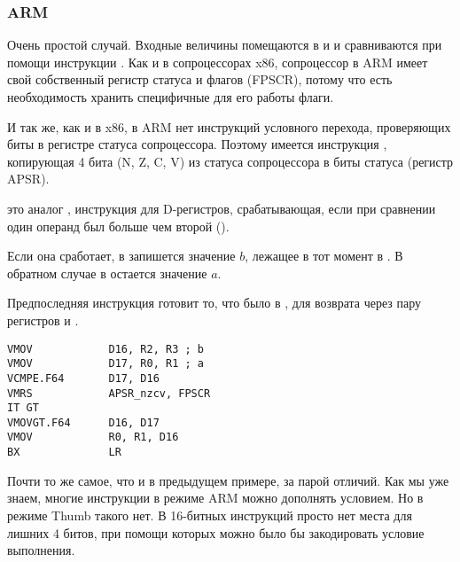 \subsubsection{ARM}

\myparagraph{\OptimizingXcodeIV (\ARMMode)}



Очень простой случай.
Входные величины помещаются в  и  и сравниваются при помощи инструкции .
Как и в сопроцессорах x86, сопроцессор в ARM имеет свой собственный регистр статуса и флагов (\ac{FPSCR}),
потому что есть необходимость хранить специфичные для его работы флаги.

И так же, как и в x86, 
в ARM нет инструкций условного перехода, проверяющих биты в регистре статуса сопроцессора. 
Поэтому имеется инструкция , копирующая 4 бита (N, Z, C, V) 
из статуса сопроцессора в биты  статуса (регистр \ac{APSR}).

 это аналог , инструкция для D-регистров, срабатывающая, если при сравнении один операнд был больше чем второй
(). 

Если она сработает, 
в  запишется значение $b$, лежащее в тот момент в .
В обратном случае в  остается значение $a$.


Предпоследняя инструкция  готовит то, что было в , для возврата через 
пару регистров  и .

\myparagraph{\OptimizingXcodeIV (\ThumbTwoMode)}

\begin{lstlisting}[caption=\OptimizingXcodeIV (\ThumbTwoMode)]
VMOV            D16, R2, R3 ; b
VMOV            D17, R0, R1 ; a
VCMPE.F64       D17, D16
VMRS            APSR_nzcv, FPSCR
IT GT 
VMOVGT.F64      D16, D17
VMOV            R0, R1, D16
BX              LR
\end{lstlisting}

Почти то же самое, что и в предыдущем примере, за парой отличий.
Как мы уже знаем, многие инструкции в режиме ARM можно дополнять условием.
Но в режиме Thumb такого нет.
В 16-битных инструкций просто нет места для лишних 4 битов, при помощи
которых можно было бы закодировать условие выполнения.

